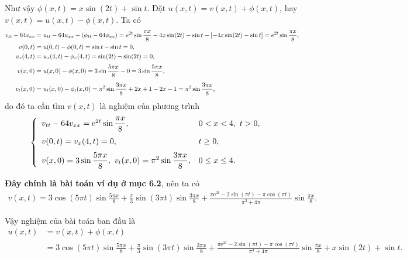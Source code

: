 \documentclass[10pt, a4paper]{article}
\begin{document}
	Như vậy $\phi(x,t)=x\sin(2t)+\sin t$. Đặt $u(x,t)=v(x,t)+\phi(x,t)$, hay $v(x,t)=u(x,t)-\phi(x,t)$. Ta có \begin{align*}
		v_{tt}-64v_{xx}&=u_{tt}-64u_{xx}-(\phi_{tt}-64\phi_{xx})=\mathrm e^{2t}\sin\dfrac{\pi x}{8}-4x\sin(2t)-\sin t-[-4x\sin(2t)-\sin t]=e^{2t}\sin\dfrac{\pi x}{8},\\
		v(0,t)&=u(0,t)-\phi(0,t)=\sin t-\sin t=0,\\
		v_x(4,t)&=u_x(4,t)-\phi_x(4,t)=\sin(2t)-\sin(2t)=0,\\
		\noalign{\vskip3pt}
		v(x,0)&=u(x,0)-\phi(x,0)=3\sin\dfrac{5\pi x}
		{8}-0=3\sin\dfrac{5\pi x}
		{8},\\
		\noalign{\vskip5pt}
		v_t(x,0)&=u_t(x,0)-\phi_t(x,0)=\pi^2\sin\dfrac{3\pi x}{8}+2x+1-2x-1=\pi^2\sin\dfrac{3\pi x}{8},
	\end{align*}
	do đó ta cần tìm $v(x,t)$ là nghiệm của phương trình $$\begin{cases}\begin{array}{ll}
			v_{tt}-64v_{xx}=\mathrm e^{2t}\sin\dfrac{\pi x}{8}, & 0<x<4,~t>0,\\
			\noalign{\vskip5pt}
			v(0,t)=v_x(4,t)=0, & t\ge0,\\
			\noalign{\vskip6pt}
			v(x,0)=3\sin\dfrac{5\pi x}
			{8},~v_t(x,0)=\pi^2\sin\dfrac{3\pi x}{8}, & 0\le x\le 4.
		\end{array}
	\end{cases}$$
	
	\textbf{Đây chính là bài toán ví dụ ở mục 6.2}, nên ta có \begin{align*}
		v(x,t)=3\cos(5\pi t)\sin\frac{5\pi x}{8}+\frac\pi3\sin(3\pi t)\sin\frac{3\pi x}{8}+\frac{\pi\mathrm e^{2t}-2\sin(\pi t)-\pi\cos(\pi t)}{\pi^3+4\pi}\sin\frac{\pi x}{8}.
	\end{align*}
	
	Vậy nghiệm của bài toán ban đầu là \begin{align*}
		u(x,t)&=v(x,t)+\phi(x,t)\\
		&=3\cos(5\pi t)\sin\frac{5\pi x}{8}+\frac\pi3\sin(3\pi t)\sin\frac{3\pi x}{8}+\frac{\pi\mathrm e^{2t}-2\sin(\pi t)-\pi\cos(\pi t)}{\pi^3+4\pi}\sin\frac{\pi x}{8}+x\sin(2t)+\sin t.
	\end{align*}
\end{document}
